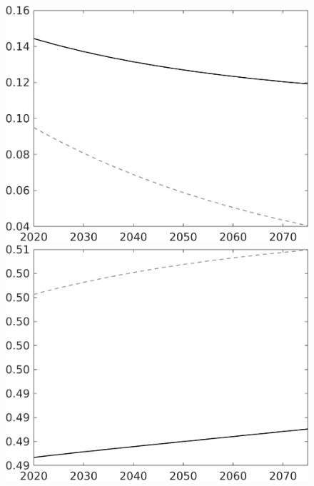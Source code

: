 \documentclass[12pt]{article}
\begin{document}
\begin{figure}
\begin{minipage}[]{0.32\textwidth}
	\end{minipage}
	\begin{minipage}[]{0.32\textwidth}
		\includegraphics[width=1\textwidth]{../../codding_model/own_basedOnFried/optimalPol_010922_revision/figures/all_13Sept22/LevTaufNoTauf_TaulCalib_regime0_sg_spillover0_nsk0_xgr0_knspil1_sep1_LFlimit0_emsbase0_countec0_GovRev0_etaa0.79_lgd0.png}
	\end{minipage}
	\begin{minipage}[]{0.32\textwidth}
		\includegraphics[width=1\textwidth]{../../codding_model/own_basedOnFried/optimalPol_010922_revision/figures/all_13Sept22/LevTaufNoTauf_TaulCalib_regime0_sn_spillover0_nsk0_xgr0_knspil1_sep1_LFlimit0_emsbase0_countec0_GovRev0_etaa0.79_lgd0.png}

\end{minipage}
\end{figure}
\end{document}
